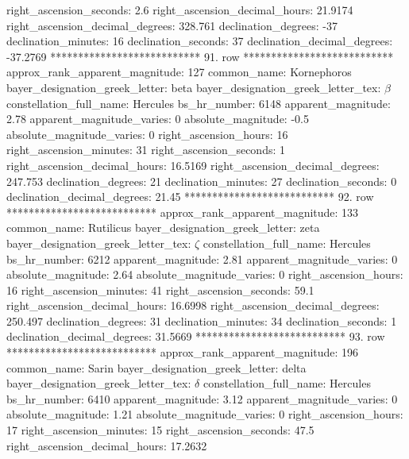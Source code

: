            right_ascension_seconds: 2.6
     right_ascension_decimal_hours: 21.9174
   right_ascension_decimal_degrees: 328.761
               declination_degrees: -37
               declination_minutes: 16
               declination_seconds: 37
       declination_decimal_degrees: -37.2769
*************************** 91. row ***************************
    approx_rank_apparent_magnitude: 127
                       common_name: Kornephoros
    bayer_designation_greek_letter: beta
bayer_designation_greek_letter_tex: $\beta$
           constellation_full_name: Hercules
                      bs_hr_number: 6148
                apparent_magnitude: 2.78
         apparent_magnitude_varies: 0
                absolute_magnitude: -0.5
         absolute_magnitude_varies: 0
             right_ascension_hours: 16
           right_ascension_minutes: 31
           right_ascension_seconds: 1
     right_ascension_decimal_hours: 16.5169
   right_ascension_decimal_degrees: 247.753
               declination_degrees: 21
               declination_minutes: 27
               declination_seconds: 0
       declination_decimal_degrees: 21.45
*************************** 92. row ***************************
    approx_rank_apparent_magnitude: 133
                       common_name: Rutilicus
    bayer_designation_greek_letter: zeta
bayer_designation_greek_letter_tex: $\zeta$
           constellation_full_name: Hercules
                      bs_hr_number: 6212
                apparent_magnitude: 2.81
         apparent_magnitude_varies: 0
                absolute_magnitude: 2.64
         absolute_magnitude_varies: 0
             right_ascension_hours: 16
           right_ascension_minutes: 41
           right_ascension_seconds: 59.1
     right_ascension_decimal_hours: 16.6998
   right_ascension_decimal_degrees: 250.497
               declination_degrees: 31
               declination_minutes: 34
               declination_seconds: 1
       declination_decimal_degrees: 31.5669
*************************** 93. row ***************************
    approx_rank_apparent_magnitude: 196
                       common_name: Sarin
    bayer_designation_greek_letter: delta
bayer_designation_greek_letter_tex: $\delta$
           constellation_full_name: Hercules
                      bs_hr_number: 6410
                apparent_magnitude: 3.12
         apparent_magnitude_varies: 0
                absolute_magnitude: 1.21
         absolute_magnitude_varies: 0
             right_ascension_hours: 17
           right_ascension_minutes: 15
           right_ascension_seconds: 47.5
     right_ascension_decimal_hours: 17.2632
